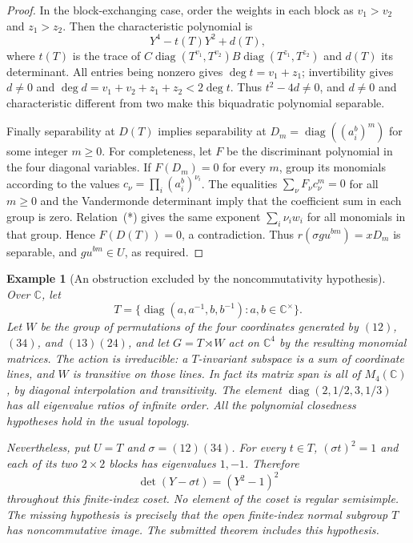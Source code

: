 \documentclass[11pt,a4paper]{article}
\newtheorem{example}[proposition]{Example}
\theoremstyle{remark}
\newcommand{\C}{\mathbb C}
\begin{document}
\begin{proof}
In the block-exchanging case, order the weights in each block as
$v_1>v_2$ and $z_1>z_2$. Then the characteristic polynomial is
\[
 Y^4-t(T)Y^2+d(T),
\]
where $t(T)$ is the trace of
$C\operatorname{diag}(T^{v_1},T^{v_2})
 B\operatorname{diag}(T^{z_1},T^{z_2})$ and $d(T)$ its determinant.
All entries being nonzero gives $\deg t=v_1+z_1$; invertibility gives
$d\ne0$ and $\deg d=v_1+v_2+z_1+z_2<2\deg t$.
Thus $t^2-4d\ne0$, and $d\ne0$ and characteristic different from two
make this biquadratic polynomial separable.

Finally separability at $D(T)$ implies separability at
$D_m=\operatorname{diag}((a_i^b)^m)$ for some integer $m\geq0$.
For completeness, let $F$ be the discriminant polynomial in the four
diagonal variables. If $F(D_m)=0$ for every $m$, group its monomials
according to the values $c_\nu=\prod_i(a_i^b)^{\nu_i}$.
The equalities $\sum_\nu F_\nu c_\nu^m=0$ for all $m\geq0$ and
the Vandermonde determinant imply that the coefficient sum in
each group is zero. Relation~(*) gives the same exponent
$\sum_i\nu_iw_i$ for all monomials in that group. Hence $F(D(T))=0$,
a contradiction. Thus $r(\sigma g u^{bm})=xD_m$ is separable,
and $g u^{bm}\in U$, as required.
\end{proof}

\begin{example}[An obstruction excluded by the noncommutativity hypothesis]
Over $\C$, let
\[
 T=\{\operatorname{diag}(a,a^{-1},b,b^{-1}):a,b\in\C^\times\}.
\]
Let $W$ be the group of permutations of the four coordinates generated
by $(12)$, $(34)$, and $(13)(24)$, and let $G=T\rtimes W$ act on
$\C^4$ by the resulting monomial matrices. The action is irreducible:
a $T$-invariant subspace is a sum of coordinate lines, and $W$ is
transitive on those lines. In fact its matrix span is all of $M_4(\C)$,
by diagonal interpolation and transitivity. The element
$\operatorname{diag}(2,1/2,3,1/3)$ has all eigenvalue ratios of
infinite order. All the polynomial closedness hypotheses hold in
the usual topology.

Nevertheless, put $U=T$ and $\sigma=(12)(34)$. For every $t\in T$,
$(\sigma t)^2=1$ and each of its two $2\times2$ blocks has eigenvalues
$1,-1$. Therefore
\[
 \det(Y-\sigma t)=(Y^2-1)^2
\]
throughout this finite-index coset. No element of the coset is
regular semisimple. The missing hypothesis is precisely that the
open finite-index normal subgroup $T$ has noncommutative image.
The submitted theorem includes this hypothesis.
\end{example}
\end{document}
